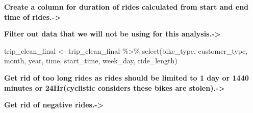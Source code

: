 \documentclass[
]{article}
\newenvironment{Shaded}{\begin{snugshade}}{\end{snugshade}}
\newcommand{\AttributeTok}[1]{\textcolor[rgb]{0.77,0.63,0.00}{#1}}
\newcommand{\DecValTok}[1]{\textcolor[rgb]{0.00,0.00,0.81}{#1}}
\newcommand{\FunctionTok}[1]{\textcolor[rgb]{0.00,0.00,0.00}{#1}}
\newcommand{\NormalTok}[1]{#1}
\newcommand{\OtherTok}[1]{\textcolor[rgb]{0.56,0.35,0.01}{#1}}
\newcommand{\SpecialCharTok}[1]{\textcolor[rgb]{0.00,0.00,0.00}{#1}}
\newcommand{\StringTok}[1]{\textcolor[rgb]{0.31,0.60,0.02}{#1}}
\begin{document}
\textbf{Create a column for duration of rides calculated from start and
end time of rides.-\textgreater{}}

\begin{Shaded}
\end{Shaded}

\textbf{Filter out data that we will not be using for this
analysis.-\textgreater{}}

\begin{Shaded}
\begin{Highlighting}[]
\NormalTok{trip\_clean\_final }\OtherTok{\textless{}{-}}\NormalTok{ trip\_clean\_final }\SpecialCharTok{\%\textgreater{}\%} 
  \FunctionTok{select}\NormalTok{(bike\_type, customer\_type, month, year, time, start\_time, week\_day, ride\_length)}
\end{Highlighting}
\end{Shaded}

\textbf{Get rid of too long rides as rides should be limited to 1 day or
1440 minutes or 24Hr(cyclistic considers these bikes are
stolen).-\textgreater{}}

\begin{Shaded}
\end{Shaded}

\textbf{Get rid of negative rides.-\textgreater{}}

\begin{Shaded}
\end{Shaded}
\end{document}
